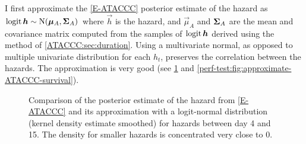 \documentclass[thesis.tex]{subfiles}
\begin{document}
I first approximate the \cref{E-ATACCC} posterior estimate of the hazard as $\operatorname{logit}{\bm{h}} \sim \operatorname{N}(\bm{\mu}_A, \bm{\Sigma}_A)$ where $\vec{h}$ is the hazard, and $\vec{\mu}_A$ and $\bm{\Sigma}_A$ are the mean and covariance matrix computed from the samples of $\operatorname{logit}{\bm{h}}$ derived using the method of \cref{ATACCC:sec:duration}.
Using a multivariate normal, as opposed to multiple univariate distribution for each $h_t$, preserves the correlation between the hazards.
The approximation is very good (see \cref{perf-test:fig:approximate-ATACCC-hazard} and \cref{perf-test:fig:approximate-ATACCC-survival}).
\begin{figure}
  \caption[Approximating the ATACCC posterior hazard as a logit-normal]{Comparison of the posterior estimate of the hazard from \cref{E-ATACCC} and its approximation with a logit-normal distribution (kernel density estimate smoothed) for hazards between day 4 and 15. The density for smaller hazards is concentrated very close to 0. \label{perf-test:fig:approximate-ATACCC-hazard}}
\end{figure}
\end{document}

